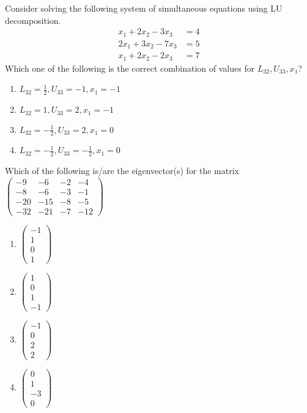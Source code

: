 \item Consider solving the following system of simultaneous equations using LU decomposition.  
	\begin{align*}
x_1+2x_2-3x_3&=4\\  2x_1+3x_2-7x_3&=5\\ x_1+2x_2-2x_3&=7
	\end{align*}
Which one of the following is the correct combination of values for $L_{32}, U_{33}, x_1$?  

\hfill{}
\begin{multicols}{2}
\begin{enumerate}
\item $L_{32}=\tfrac{1}{2}, U_{33}=-1, x_1=-1$
\item $L_{32}=1, U_{33}=2, x_1=-1$
\item $L_{32}=-\tfrac{1}{2}, U_{33}=2, x_1=0$
\item $L_{32}=-\tfrac{1}{2}, U_{33}=-\tfrac{1}{2}, x_1=0$
\end{enumerate}
\end{multicols}
\item Which of the following is/are the eigenvector(s) for the matrix  
\hfill{}
$
\begin{pmatrix}
-9 & -6 & -2 & -4\\
-8 & -6 & -3 & -1\\
-20 & -15 & -8 & -5\\
-32 & -21 & -7 & -12
\end{pmatrix}
$
\begin{multicols}{4}
\begin{enumerate}
\item $\begin{pmatrix}-1\\1\\0\\1\end{pmatrix}$
\item $\begin{pmatrix}1\\0\\1\\-1\end{pmatrix}$
\item $\begin{pmatrix}-1\\0\\2\\2\end{pmatrix}$
\item $\begin{pmatrix}0\\1\\-3\\0\end{pmatrix}$
\end{enumerate}
\end{multicols}

